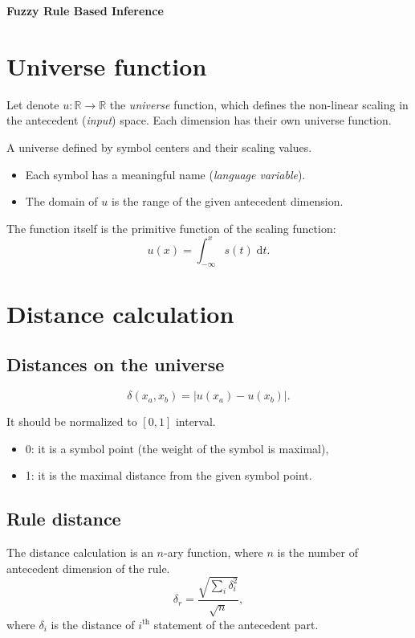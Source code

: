 \documentclass[a4paper,12pt]{article}
\begin{document}
\begin{center}
    \Large \textbf{Fuzzy Rule Based Inference}
\end{center}

\section{Universe function}

Let denote $u: \mathbb{R} \rightarrow \mathbb{R}$ the \textit{universe} function, which defines the non-linear scaling in the antecedent (\textit{input}) space.
Each dimension has their own universe function.

A universe defined by symbol centers and their scaling values.
\begin{itemize}
    \item Each symbol has a meaningful name (\textit{language variable}).
    \item The domain of $u$ is the range of the given antecedent dimension.
\end{itemize}

The function itself is the primitive function of the scaling function:
\[
u(x) = \int_{-\infty}^{x} \! s(t) \; \mathrm{d}t.
\]

\section{Distance calculation}

\subsection{Distances on the universe}

\[
\delta(x_a, x_b) = |u(x_a) - u(x_b)|.
\]

It should be normalized to $[0, 1]$ interval.
\begin{itemize}
    \item 0: it is a symbol point (the weight of the symbol is maximal),
    \item 1: it is the maximal distance from the given symbol point.
\end{itemize}

\subsection{Rule distance}

The distance calculation is an $n$-ary function, where $n$ is the number of antecedent dimension of the rule.
\[
\delta_r = \dfrac{\sqrt{\sum_i \delta_i^2}}{\sqrt{n}},
\]
where $\delta_i$ is the distance of $i^{\text{th}}$ statement of the antecedent part.
\end{document}
